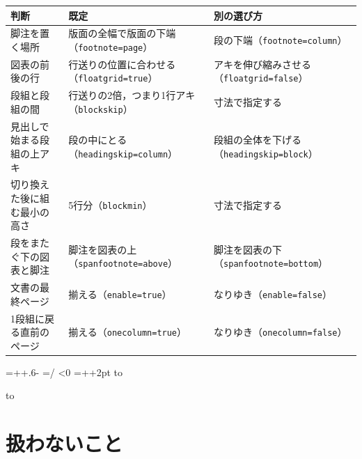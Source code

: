 \documentclass[twocolumn,paper=a4,fontsize=10pt]{jlreq}
\newcommand\sandan{\evenendcolumns[columnsep=1\zw]{3}}
\newcommand\opt[1]{\texttt{#1}}
\newenvironment{gyouhako}{\par
  \begin{lrbox}{\gyouhakobox}\begin{minipage}{\linewidth}}
  {\end{minipage}\end{lrbox}%
  \dimen0=\dimexpr\ht\gyouhakobox+\dp\gyouhakobox+.6\baselineskip-\topskip-2pt\relax
  \gyoulines=\numexpr\dimen0/\baselineskip\relax
  \ifdim\dimexpr\baselineskip*\gyoulines\relax<\dimen0 \advance\gyoulines 1 \fi
  \ifnum\gyoulines<0 \gyoulines=0 \fi
  \dimen2=\dimexpr\topskip+\baselineskip*\gyoulines+2pt\relax
  \noindent\vbox to\topskip{\vbox to\dimen2{\vss\box\gyouhakobox\vss}\vss}\par
  \nobreak\nointerlineskip\vbox to\gyoulines\baselineskip{}}
\newenvironment{hyou}{\begin{gyouhako}\centering\small}{\end{gyouhako}}
\begin{document}
\begin{hyou}
  \begin{tabular}{@{}P{.3\linewidth}P{.32\linewidth}P{.32\linewidth}@{}}
    \hline
    判断 & 既定 & 別の選び方 \\
    \hline
    脚注を置く場所 & 版面の全幅で版面の下端\newline（\opt{footnote=page}） &
      段の下端（\opt{footnote=column}） \\
    図表の前後の行 & 行送りの位置に合わせる\newline（\opt{floatgrid=true}） &
      アキを伸び縮みさせる\newline（\opt{floatgrid=false}） \\
    段組と段組の間 & 行送りの2倍，つまり1行アキ\newline（\opt{blockskip}） &
      寸法で指定する \\
    見出しで始まる段組の上アキ & 段の中にとる\newline（\opt{headingskip=column}） &
      段組の全体を下げる\newline（\opt{headingskip=block}） \\
    切り換えた後に組む最小の高さ & 5行分（\opt{blockmin}） &
      寸法で指定する \\
    段をまたぐ下の図表と脚注 & 脚注を図表の上\newline（\opt{spanfootnote=above}） &
      脚注を図表の下\newline（\opt{spanfootnote=bottom}） \\
    文書の最終ページ & 揃える（\opt{enable=true}） & なりゆき（\opt{enable=false}） \\
    1段組に戻る直前のページ & 揃える（\opt{onecolumn=true}） &
      なりゆき（\opt{onecolumn=false}） \\
    \hline
  \end{tabular}
\end{hyou}

\sandan
\section{扱わないこと}
\end{document}
